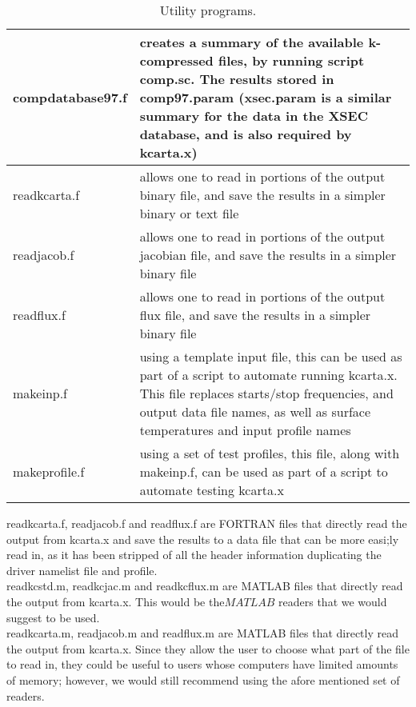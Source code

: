 \documentclass[12pt]{article}
\newlength{\colwidth}
\begin{document}
{{{{\begin{small}
\begin{longtable}{|l|p{\colwidth}|}
\caption{Utility programs.}\\
\hline
compdatabase97.f & creates a summary of the available k-compressed files, 
       by running script comp.sc.  The results stored in {\sf comp97.param}
       ({\sf xsec.param} is a similar summary for the data in the {\sf XSEC} 
       database, and is also required by {\sf kcarta.x})\\ \hline
readkcarta.f & allows one to read in portions of the output binary file,
               and save the results in a simpler binary or text file\\ \hline
readjacob.f & allows one to read in portions of the output jacobian file,
              and save the results in a simpler binary file\\ \hline
readflux.f & allows one to read in portions of the output flux file,
              and save the results in a simpler binary file\\ \hline
makeinp.f & using a template input file, this can be used as part
      of a script to automate running {\sf kcarta.x}. 
      This file replaces starts/stop frequencies, and output data file
      names, as well as surface temperatures and input profile names\\ \hline
makeprofile.f & using a set of test profiles, this file, along with
                makeinp.f, can be used as part of a script to automate
                testing {\sf kcarta.x} \\ \hline
\end{longtable}
\end{small}

readkcarta.f, readjacob.f and readflux.f are {\sf FORTRAN} files that 
directly read the output from {\sf kcarta.x} and save the results to a data 
file that can be more easi;ly read in, as it has been stripped of all the
header information duplicating the driver namelist file and profile.\\

readkcstd.m, readkcjac.m and readkcflux.m are {\sf MATLAB} files that 
directly read the output from {\sf kcarta.x}. This would be the$MATLAB$ 
readers that we would suggest to be used.\\

readkcarta.m, readjacob.m and readflux.m are {\sf MATLAB} files that 
directly read the output from {\sf kcarta.x}. Since they allow the user to 
choose what part of the file to read in, they could be useful to users whose
computers have limited amounts of memory; however, we would still recommend
using the afore mentioned set of readers.

}}}}
\end{document}
